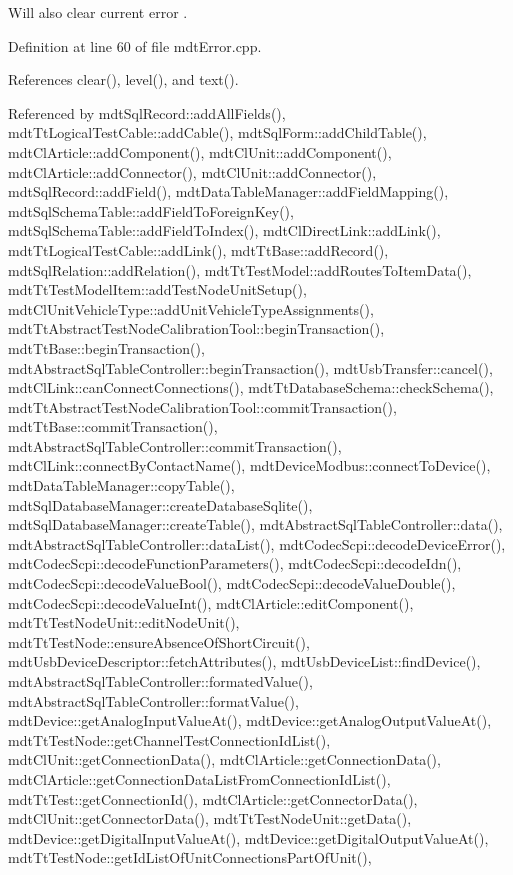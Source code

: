 Will also clear current error . 

Definition at line 60 of file mdt\-Error.\-cpp.



References clear(), level(), and text().



Referenced by mdt\-Sql\-Record\-::add\-All\-Fields(), mdt\-Tt\-Logical\-Test\-Cable\-::add\-Cable(), mdt\-Sql\-Form\-::add\-Child\-Table(), mdt\-Cl\-Article\-::add\-Component(), mdt\-Cl\-Unit\-::add\-Component(), mdt\-Cl\-Article\-::add\-Connector(), mdt\-Cl\-Unit\-::add\-Connector(), mdt\-Sql\-Record\-::add\-Field(), mdt\-Data\-Table\-Manager\-::add\-Field\-Mapping(), mdt\-Sql\-Schema\-Table\-::add\-Field\-To\-Foreign\-Key(), mdt\-Sql\-Schema\-Table\-::add\-Field\-To\-Index(), mdt\-Cl\-Direct\-Link\-::add\-Link(), mdt\-Tt\-Logical\-Test\-Cable\-::add\-Link(), mdt\-Tt\-Base\-::add\-Record(), mdt\-Sql\-Relation\-::add\-Relation(), mdt\-Tt\-Test\-Model\-::add\-Routes\-To\-Item\-Data(), mdt\-Tt\-Test\-Model\-Item\-::add\-Test\-Node\-Unit\-Setup(), mdt\-Cl\-Unit\-Vehicle\-Type\-::add\-Unit\-Vehicle\-Type\-Assignments(), mdt\-Tt\-Abstract\-Test\-Node\-Calibration\-Tool\-::begin\-Transaction(), mdt\-Tt\-Base\-::begin\-Transaction(), mdt\-Abstract\-Sql\-Table\-Controller\-::begin\-Transaction(), mdt\-Usb\-Transfer\-::cancel(), mdt\-Cl\-Link\-::can\-Connect\-Connections(), mdt\-Tt\-Database\-Schema\-::check\-Schema(), mdt\-Tt\-Abstract\-Test\-Node\-Calibration\-Tool\-::commit\-Transaction(), mdt\-Tt\-Base\-::commit\-Transaction(), mdt\-Abstract\-Sql\-Table\-Controller\-::commit\-Transaction(), mdt\-Cl\-Link\-::connect\-By\-Contact\-Name(), mdt\-Device\-Modbus\-::connect\-To\-Device(), mdt\-Data\-Table\-Manager\-::copy\-Table(), mdt\-Sql\-Database\-Manager\-::create\-Database\-Sqlite(), mdt\-Sql\-Database\-Manager\-::create\-Table(), mdt\-Abstract\-Sql\-Table\-Controller\-::data(), mdt\-Abstract\-Sql\-Table\-Controller\-::data\-List(), mdt\-Codec\-Scpi\-::decode\-Device\-Error(), mdt\-Codec\-Scpi\-::decode\-Function\-Parameters(), mdt\-Codec\-Scpi\-::decode\-Idn(), mdt\-Codec\-Scpi\-::decode\-Value\-Bool(), mdt\-Codec\-Scpi\-::decode\-Value\-Double(), mdt\-Codec\-Scpi\-::decode\-Value\-Int(), mdt\-Cl\-Article\-::edit\-Component(), mdt\-Tt\-Test\-Node\-Unit\-::edit\-Node\-Unit(), mdt\-Tt\-Test\-Node\-::ensure\-Absence\-Of\-Short\-Circuit(), mdt\-Usb\-Device\-Descriptor\-::fetch\-Attributes(), mdt\-Usb\-Device\-List\-::find\-Device(), mdt\-Abstract\-Sql\-Table\-Controller\-::formated\-Value(), mdt\-Abstract\-Sql\-Table\-Controller\-::format\-Value(), mdt\-Device\-::get\-Analog\-Input\-Value\-At(), mdt\-Device\-::get\-Analog\-Output\-Value\-At(), mdt\-Tt\-Test\-Node\-::get\-Channel\-Test\-Connection\-Id\-List(), mdt\-Cl\-Unit\-::get\-Connection\-Data(), mdt\-Cl\-Article\-::get\-Connection\-Data(), mdt\-Cl\-Article\-::get\-Connection\-Data\-List\-From\-Connection\-Id\-List(), mdt\-Tt\-Test\-::get\-Connection\-Id(), mdt\-Cl\-Article\-::get\-Connector\-Data(), mdt\-Cl\-Unit\-::get\-Connector\-Data(), mdt\-Tt\-Test\-Node\-Unit\-::get\-Data(), mdt\-Device\-::get\-Digital\-Input\-Value\-At(), mdt\-Device\-::get\-Digital\-Output\-Value\-At(), mdt\-Tt\-Test\-Node\-::get\-Id\-List\-Of\-Unit\-Connections\-Part\-Of\-Unit(), 